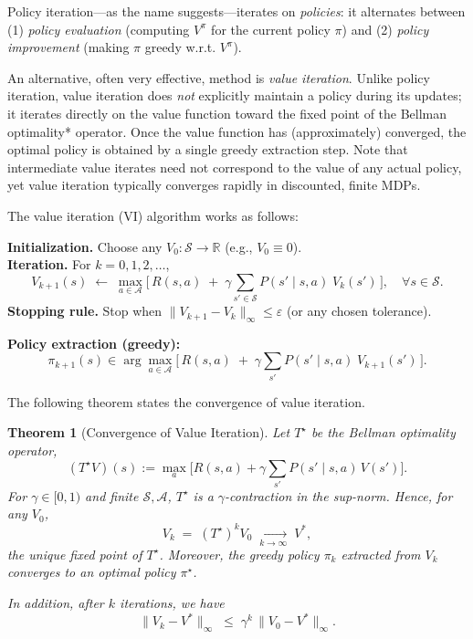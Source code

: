 \documentclass[
]{book}
\newtheorem{theorem}{Theorem}[chapter]
\theoremstyle{definition}
\theoremstyle{definition}
\theoremstyle{definition}
\theoremstyle{definition}
\theoremstyle{remark}
\begin{document}
Policy iteration---as the name suggests---iterates on \emph{policies}: it alternates between
(1) \emph{policy evaluation} (computing \(V^{\pi}\) for the current policy \(\pi\)) and
(2) \emph{policy improvement} (making \(\pi\) greedy w.r.t. \(V^{\pi}\)).

An alternative, often very effective, method is \emph{value iteration}. Unlike policy iteration, value iteration does \emph{not} explicitly maintain a policy during its updates; it iterates directly on the value function toward the fixed point of the Bellman optimality* operator. Once the value function has (approximately) converged, the optimal policy is obtained by a single greedy extraction step. Note that intermediate value iterates need not correspond to the value of any actual policy, yet value iteration typically converges rapidly in discounted, finite MDPs.

The value iteration (VI) algorithm works as follows:

\textbf{Initialization.} Choose any \(V_0:\mathcal{S}\to\mathbb{R}\) (e.g., \(V_0 \equiv 0\)).\\
\textbf{Iteration.} For \(k=0,1,2,\dots\),
\[
V_{k+1}(s) \;\leftarrow\; \max_{a\in\mathcal{A}}
\Big[\, R(s,a) \;+\; \gamma \sum_{s'\in\mathcal{S}} P(s'\mid s,a)\; V_k(s') \,\Big],
\quad \forall s\in\mathcal{S}.
\]
\textbf{Stopping rule.} Stop when \(\lVert V_{k+1}-V_k\rVert_\infty \le \varepsilon\) (or any chosen tolerance).

\textbf{Policy extraction (greedy):}
\[
\pi_{k+1}(s) \in \arg\max_{a\in\mathcal{A}}
\Big[\, R(s,a) \;+\; \gamma \sum_{s'} P(s'\mid s,a)\; V_{k+1}(s') \,\Big].
\]

The following theorem states the convergence of value iteration.

\begin{theorem}[Convergence of Value Iteration]
\protect\hypertarget{thm:ValueIterationConvergence}{}\label{thm:ValueIterationConvergence}Let \(T^\star\) be the Bellman optimality operator,
\[
(T^\star V)(s) := \max_{a}\Big[ R(s,a) + \gamma \sum_{s'} P(s'\mid s,a)\, V(s') \Big].
\]
For \(\gamma\in[0,1)\) and finite \(\mathcal{S},\mathcal{A}\), \(T^\star\) is a \(\gamma\)-contraction in the sup-norm. Hence, for any \(V_0\),
\[
V_k \;=\; (T^\star )^k V_0 \;\xrightarrow[k\to\infty]{}\; V^*,
\]
the unique fixed point of \(T^\star\). Moreover, the greedy policy \(\pi_k\) extracted from \(V_k\) converges to an optimal policy \(\pi^\star\).

In addition, after \(k\) iterations, we have
\[
\lVert V_k - V^* \rVert_\infty \;\le\; \gamma^k \, \lVert V_0 - V^* \rVert_\infty.
\]
\end{theorem}
\end{document}
